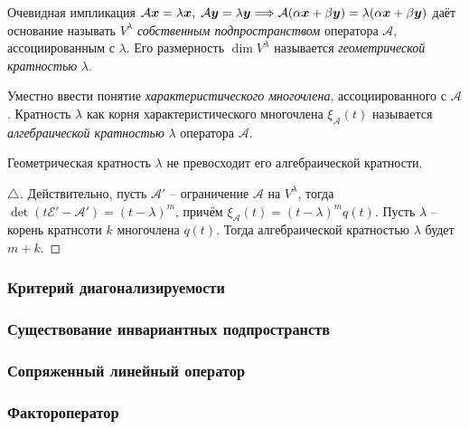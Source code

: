 Очевидная импликация
$
     \mathcal A \mbox{\boldmath $x$} = \lambda \mbox{\boldmath $x$}, \; \mathcal A \mbox{\boldmath $y$} = \lambda \mbox{\boldmath $y$} \Longrightarrow \mathcal A(\alpha \mbox{\boldmath $x$} + \beta \mbox{\boldmath $y$}) = \lambda(\alpha \mbox{\boldmath $x$} + \beta \mbox{\boldmath $y$})
 $ 
 даёт основание называть $V^{\lambda} $ \textit{собственным подпространством} оператора $\mathcal A $, ассоциированным с $\lambda $. Его размерность $\dim V^{\lambda} $ называется \textit{геометрической кратностью} $\lambda $.

Уместно ввести понятие \textit{характеристического многочлена}, ассоциированного с 
$\mathcal A $.  Кратность $\lambda $ как корня характеристического многочлена $\xi_{\mathcal A} (t)$ называется \textit{алгебраической кратностью} $\lambda $ оператора $\mathcal A $.

\begin{to_thr} 
     Геометрическая кратность $\lambda $ не превосходит его алгебраической кратности.
\end{to_thr}
 
\begin{proof}[$\triangle$]
Действительно, пусть $\mathcal A' $ -- ограничение $\mathcal A $ на $V^{\lambda} $, тогда $\det (t \mathcal E' - \mathcal A') = (t - \lambda)^m $, причём $\xi_{\mathcal A} (t) = (t-\lambda)^m q(t)$. Пусть $\lambda $ -- корень кратнсоти $k $ многочлена $q(t) $. Тогда алгебраической кратностью $\lambda $ будет $m+k $.
\end{proof}


\subsubsection{Критерий диагонализируемости}







\subsubsection{Существование инвариантных подпространств}
\subsubsection{Сопряженный линейный оператор}
\subsubsection{Фактороператор}